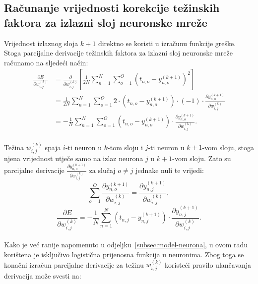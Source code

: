 \subsection{Računanje vrijednosti korekcije težinskih faktora za izlazni sloj neuronske mreže}
\label{subsec:racunanje-vrijednosti-korekcije-tezinskih-faktora-za-izlazni-sloj-neuronske-mreze}
Vrijednost izlaznog sloja $k + 1$ direktno se koristi u izračunu funkcije greške. Stoga parcijalne derivacije težinskih
faktora za izlazni sloj neuronske mreže računamo na sljedeći način:\\
\begin{align*}
    \frac{\partial E}{\partial w_{i, j}^{(k)}} & = \frac{\partial}{\partial w_{i, j}^{(k)}} \left[\frac{1}{2N}
    \sum_{n = 1}^{N} \sum_{o = 1}^{O} \left(t_{n, o} - y_{n, o}^{(k + 1)}\right)^2\right]\\
    & = \frac{1}{2N} \sum_{n = 1}^{N} \sum_{o = 1}^{O} 2 \cdot \left(t_{n, o} - y_{n, o}^{(k + 1)}\right) \cdot (-1)
    \cdot \frac{\partial y_{n, o}^{(k + 1)}}{\partial w_{i, j}^{(k)}}\\
    & = -\frac{1}{N} \sum_{n = 1}^{N} \sum_{o = 1}^{O} \left(t_{n, o} - y_{n, o}^{(k + 1)}\right) \cdot
    \frac{\partial y_{n, o}^{(k + 1)}}{\partial w_{i, j}^{(k)}}.
\end{align*}\\
Težina $w_{i, j}^{(k)}$ spaja $i$-ti neuron u $k$-tom sloju i $j$-ti neuron u $k + 1$-vom sloju, stoga njena vrijednost
utječe samo na izlaz neurona $j$ u $k + 1$-vom sloju. Zato su parcijalne derivacije
$\frac{\partial y_{n, o}^{(k + 1)}}{\partial w_{i, j}^{(k)}}$ za slučaj $o \neq j$ jednake nuli te vrijedi:\\
\begin{equation*}
    \sum_{o = 1}^{O} \frac{\partial y_{n, o}^{(k + 1)}}{\partial w_{i, j}^{(k)}} =
    \frac{\partial y_{n, j}^{(k + 1)}}{\partial w_{i, j}^{(k)}},
\end{equation*}
\begin{equation*}
    \frac{\partial E}{\partial w_{i, j}^{(k)}} = -\frac{1}{N} \sum_{n = 1}^{N} \left(t_{n, j} - y_{n, j}^{(k + 1)}
    \right) \cdot \frac{\partial y_{n, j}^{(k + 1)}}{\partial w_{i, j}^{(k)}}.
\end{equation*}\\
Kako je već ranije napomenuto u odjeljku\ \ref{subsec:model-neurona}, u ovom radu korištena je isključivo logistična
prijenosna funkcija u neuronima. Zbog toga se konačni izračun parcijalne derivacije za težinu $w_{i, j}^{(k)}$ koristeći
pravilo ulančavanja derivacija može svesti na:\\
